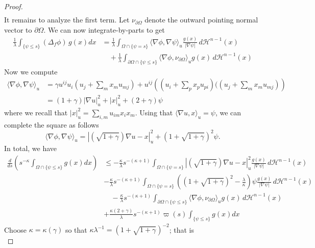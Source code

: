 \documentclass[12pt,reqno]{amsart}
\newcommand{\del}{\partial}
\numberwithin{equation}{section}
\begin{document}
\begin{proof}
\begin{equation}
\begin{aligned}
\end{aligned}
\end{equation}
It remains to analyze the first term. Let $\nu_{\del\Omega}$ denote the outward pointing normal vector to $\del \Omega$. We can now integrate-by-parts to get
\begin{equation}\label{eq: IBPsketchy}
\begin{aligned}
    \frac{1}{\lambda}\int_{\{\psi \leq s\}}(\Delta_f \phi)\,g(x)dx&= \frac{1}{\lambda}\int_{\Omega \cap \{\psi =s\}}\langle \nabla \phi, \nabla \psi \rangle_{u}\frac{g(x)}{|\nabla \psi|} \, d\mathcal{H}^{n-1}(x)\\
    &\quad +\frac{1}{\lambda} \int_{\del \Omega \cap \{\psi \leq s\}} \langle \nabla \phi, \nu_{\del \Omega}\rangle_u g(x)\, d\mathcal{H}^{n-1}(x)
\end{aligned}
\end{equation}
Now we compute
\[
\begin{aligned}
\langle \nabla \phi, \nabla \psi\rangle_u &= \gamma u^{ij} u_i(u_j+\sum_mx_mu_{mj}) +u^{ij}\left((u_i+\sum_px_pu_{pi})((u_j+\sum_mx_mu_{mj})\right)\\
&= (1+\gamma)|\nabla u|^2_u + |x|_u^2 +(2+\gamma)\psi
\end{aligned}
\]
where we recall that $|x|_u^2 = \sum_{i,m} u_{im}x_ix_m$.  Using that $\langle \nabla u, x\rangle_u= \psi$, we can complete the square as follows
\[
\langle \nabla \phi, \nabla \psi\rangle_u  = |(\sqrt{1+\gamma}) \nabla u -x|^2_{u} +(1+\sqrt{1+\gamma})^2\psi.
\]
In total, we have
\[
\begin{aligned}
    \frac{d}{ds}\left(s^{-\kappa}\int_{\Omega \cap \{\psi \leq s\}} g(x)dx\right) &\leq -\frac{\kappa}{\lambda}s^{-(\kappa+1)}\int_{\Omega \cap \{\psi =s\}}|(\sqrt{1+\gamma}) \nabla u -x|^2_{u} \frac{g(x)}{|\nabla \psi|}\, d\mathcal{H}^{n-1}(x)\\
    &-\frac{\kappa}{\lambda}s^{-(\kappa+1)}\int_{\Omega\cap\{\psi =s\}}\left((1+\sqrt{1+\gamma})^2-\frac{\lambda}{\kappa}\right)\psi\frac{g(x)}{|\nabla \psi|}\, d\mathcal{H}^{n-1}(x)\\
    &\quad -\frac{\kappa}{\lambda}s^{-(\kappa+1)}\int_{\del \Omega \cap \{\psi \leq s\}} \langle \nabla \phi, \nu_{\del \Omega}\rangle_u g(x)\, d\mathcal{H}^{n-1}(x)\\
    &+\frac{\kappa(2+\gamma)}{\lambda} s^{-(\kappa+1)} \varpi(s)\int_{\{\psi \leq s\} } g(x) dx
\end{aligned}
\]
Choose $\kappa= \kappa(\gamma)$ so that $\kappa\lambda^{-1} = (1+\sqrt{1+\gamma})^{-2}$; that is
\[
\]
\end{proof}
\end{document}
